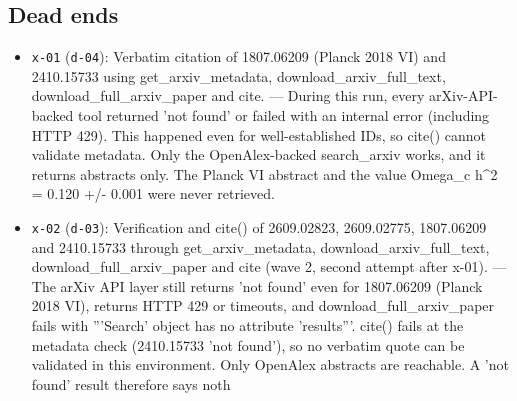 \documentclass[11pt,a4paper]{article}
\begin{document}
\subsection{Dead ends}
\begin{itemize}
  \item \texttt{x-01} (\texttt{d-04}): Verbatim citation of 1807.06209 (Planck 2018 VI) and 2410.15733 using get\_arxiv\_metadata, download\_arxiv\_full\_text, download\_full\_arxiv\_paper and cite. --- During this run, every arXiv-API-backed tool returned 'not found' or failed with an internal error (including HTTP 429). This happened even for well-established IDs, so cite() cannot validate metadata. Only the OpenAlex-backed search\_arxiv works, and it returns abstracts only. The Planck VI abstract and the value Omega\_c h\textasciicircum{}2 = 0.120 +/- 0.001 were never retrieved.
  \item \texttt{x-02} (\texttt{d-03}): Verification and cite() of 2609.02823, 2609.02775, 1807.06209 and 2410.15733 through get\_arxiv\_metadata, download\_arxiv\_full\_text, download\_full\_arxiv\_paper and cite (wave 2, second attempt after x-01). --- The arXiv API layer still returns 'not found' even for 1807.06209 (Planck 2018 VI), returns HTTP 429 or timeouts, and download\_full\_arxiv\_paper fails with '''Search' object has no attribute 'results'''. cite() fails at the metadata check (2410.15733 'not found'), so no verbatim quote can be validated in this environment. Only OpenAlex abstracts are reachable. A 'not found' result therefore says noth
\end{itemize}
\end{document}
